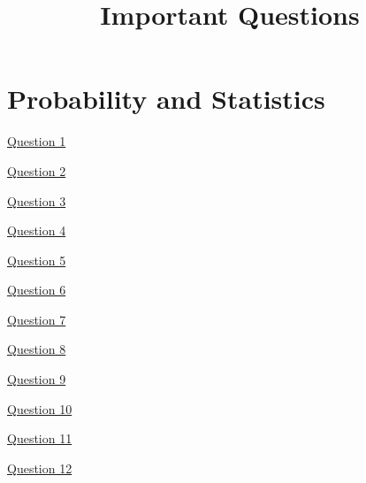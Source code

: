 \documentclass[12pt,a4paper]{article}
\title{Important Questions}
\begin{document}
\maketitle
 \section{Probability and Statistics} 
\href{https://qr.ae/psxSqU}{Question 1}

\href{https://qr.ae/psxS6A}{Question 2}

\href{https://qr.ae/psxS6J}{Question 3}

\href{https://qr.ae/pvFW3L}{Question 4}

\href{https://qr.ae/psxSEe}{Question 5}

\href{https://www.quora.com/unanswered/You-draw-five-cards-from-a-standard-deck-without-replacement-What-is-the-probability-of-getting-exactly-two-aces?ch=17&oid=190963353&share=74b78dbc&srid=apAO&target_type=question}{Question 6}

\href{https://www.quora.com/10-balls-are-thrown-into-5-bins-uniformly-at-random-and-independently-what-is-the-probability-that-there-are-no-empty-bins/answer/Amit-Goyal-135?ch=17&oid=60293502&share=a070c39e&srid=apAO&target_type=answer}{Question 7}

\href{https://www.quora.com/An-urn-containing-5-red-5-black-and-10-white-balls-If-balls-are-drawn-without-replacement-What-is-the-probability-that-in-first-7-draws-at-least-one-ball-of-each-colour-is-drawn/answer/Amit-Goyal-135?ch=17&oid=79414535&share=a153091d&srid=apAO&target_type=answer}{Question 8}

\href{https://www.quora.com/How-do-I-solve-this-permutation-problem/answer/Amit-Goyal-135?ch=17&oid=22332361&share=6e8ebbf8&srid=apAO&target_type=answer}{Question 9}

\href{https://www.quora.com/What-is-the-probability-that-every-event-in-a-set-of-events-has-occurred/answer/Amit-Goyal-135?ch=17&oid=38474727&share=3bd7f812&srid=apAO&target_type=answer}{Question 10}

\href{https://www.quora.com/A-100-page-book-has-200-printing-errors-distributed-randomly-through-the-pages-What-is-the-probability-that-one-of-the-pages-will-be-free-of-errors/answer/Amit-Goyal-135?ch=17&oid=34799232&share=524bdad7&srid=apAO&target_type=answer}{Question 11}

\href{https://www.quora.com/Three-balls-are-in-a-bag-I-draw-and-replace-them-one-at-a-time-How-many-times-should-I-draw-to-have-a-90-chance-of-drawing-every-one-at-least-once/answer/Amit-Goyal-135?ch=17&oid=35429044&share=2930b702&srid=apAO&target_type=answer}{Question 12}
\end{document}
